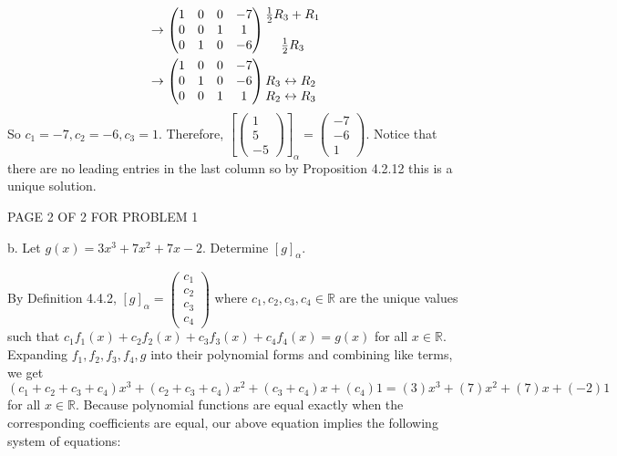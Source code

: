 \documentclass[12pt]{article}
\newenvironment{problem}[2][Problem]
{
	\begin{trivlist} 
		\item[\hskip \labelsep {\bfseries #1 #2:}]
	}
{
	\end{trivlist}
	}
\newenvironment{solution}[1][Solution]
{
	\begin{trivlist} 
		\item[\hskip \labelsep {\itshape #1:}]
	}
	{
	\end{trivlist}
}
\begin{document}
\begin{problem}{5}
\begin{solution}
\begin{align*}
& \rightarrow \begin{pmatrix} 1&0&0&-7\\0&0&1&1\\0&1&0&-6\end{pmatrix} \begin{matrix} \frac{1}{2}R_3 + R_1 \hphantom{1} \\  \hphantom{1} \\ \frac{1}{2} R_3 \hphantom{1} \end{matrix}\\
& \rightarrow \begin{pmatrix} 1&0&0&-7\\0&1&0&-6\\0&0&1&1\end{pmatrix} \begin{matrix} \hphantom{1} \\ R_3 \leftrightarrow R_2 \hphantom{1} \\ R_2 \leftrightarrow R_3  \hphantom{1} \end{matrix}
\end{align*}
So $c_1 = -7, c_2  =-6, c_3 = 1$. Therefore, $\left[ \begin{pmatrix} 1\\5\\-5 \end{pmatrix} \right]_{\alpha}= \begin{pmatrix} -7\\-6\\1\end{pmatrix}$. Notice that there are no leading entries in the last column so by Proposition 4.2.12 this is a unique solution.
\end{solution}
\vfill
\centerline{PAGE 2 OF 2 FOR PROBLEM 1}
%
%
%
%
%
%
\newpage
b. Let $g(x)=3x^3+7x^2+7x-2$. Determine $[g]_{\alpha}$.
\begin{solution}
By Definition 4.4.2, $[g]_{\alpha} = \begin{pmatrix} c_1\\c_2\\c_3\\c_4\end{pmatrix}$ where $c_1,c_2,c_3,c_4 \in \mathbb{R}$ are the unique values such that $c_1 f_1(x) + c_2 f_2(x) + c_3 f_3(x) + c_4 f_4(x) = g(x)$ for all $x \in \mathbb{R}$. Expanding $f_1,f_2,f_3,f_4,g$ into their polynomial forms and combining like terms, we get $(c_1+c_2+c_3+c_4)x^3 + (c_2+c_3+c_4)x^2 + (c_3+c_4)x + (c_4)1 = (3)x^3 + (7)x^2 +(7)x +(-2)1$ for all $x \in \mathbb{R}$. Because polynomial functions are equal exactly when the corresponding coefficients are equal, our above equation implies the following system of equations:

\end{solution}
\end{problem}
\end{document}
